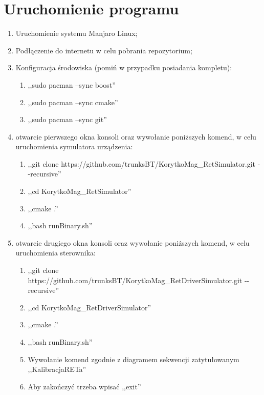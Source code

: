 \section{Uruchomienie programu}
    \begin{enumerate}
        \item Uruchomienie systemu Manjaro Linux;
        \item Podłączenie do internetu w celu pobrania repozytorium;
        \item Konfiguracja środowiska (pomiń w przypadku posiadania kompletu):
        \begin{enumerate}
            \item ,,sudo pacman --sync boost''
            \item ,,sudo pacman --sync cmake''
            \item ,,sudo pacman --sync git''
        \end{enumerate}
        \item otwarcie pierwszego okna konsoli oraz wywołanie poniższych komend, w celu uruchomienia symulatora urządzenia:
		\begin{enumerate}
			\item ,,git clone https://github.com/trunksBT/KorytkoMag\_RetSimulator.git -{}-recursive''
			\item ,,cd KorytkoMag\_RetSimulator''
			\item ,,cmake .''
			\item ,,bash runBinary.sh''
		\end{enumerate}
		\item otwarcie drugiego okna konsoli oraz wywołanie poniższych komend, w celu uruchomienia sterownika:
		\begin{enumerate}
			\item ,,git clone https://github.com/trunksBT/KorytkoMag\_RetDriverSimulator.git -{}-recursive''
			\item ,,cd KorytkoMag\_RetDriverSimulator''
			\item ,,cmake .''
			\item ,,bash runBinary.sh''
			\item Wywołanie komend zgodnie z diagramem sekwencji zatytułowanym ,,KalibracjaRETa''
			\item Aby zakończyć trzeba wpisać ,,exit''
		\end{enumerate}
    \end{enumerate}
